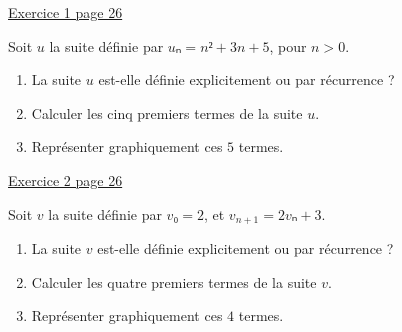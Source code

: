 \documentclass{automatisme}
\begin{document}
\begin{frame}
	\uline{\Large{Exercice 1 page 26}} \bigskip

	Soit $u$ la suite définie par $uₙ = n² + 3n + 5$, pour $n > 0$.
	\begin{enumerate}
		\item La suite $u$ est-elle définie explicitement ou par récurrence ?
		\item Calculer les cinq premiers termes de la suite $u$.
		\item Représenter graphiquement ces $5$ termes.
	\end{enumerate} \vfill

	\uline{\Large{Exercice 2 page 26}} \bigskip

	Soit $v$ la suite définie par $v₀ = 2$, et $v_{n+1} = 2vₙ + 3$.
	\begin{enumerate}
		\item La suite $v$ est-elle définie explicitement ou par récurrence ?
		\item Calculer les quatre premiers termes de la suite $v$.
		\item Représenter graphiquement ces $4$ termes.
	\end{enumerate}
\end{frame}
\end{document}
